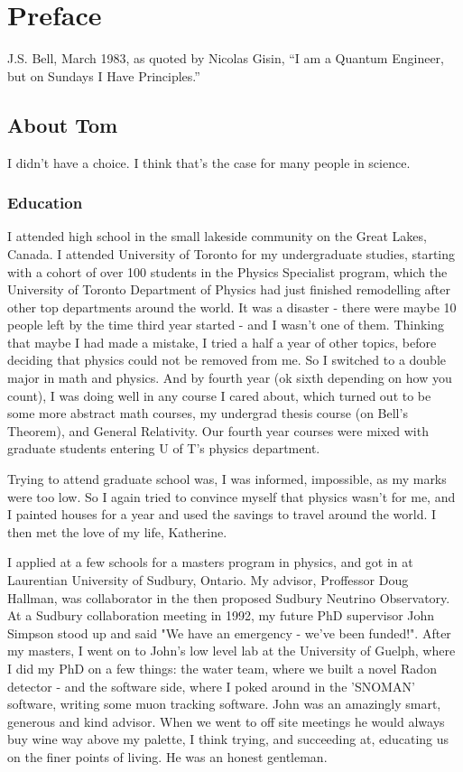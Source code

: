 \documentclass[../rzero]{subfiles}
\begin{document}
\chapter{Preface}

\begin{chapquote}{J.S. Bell, March 1983, as quoted by Nicolas Gisin, \textit{\cite{bertlmannQuantumUnspeakablesBell2002}}}
``I am a Quantum Engineer, but on Sundays I Have Principles.''
\end{chapquote}

\section*{About Tom}
I didn't have a choice. I think that's the case for many people in science. 

\subsection*{Education}
I attended high school in the small lakeside community on the Great Lakes, Canada. I attended University of Toronto for my undergraduate studies, starting with a cohort of over 100 students in the Physics Specialist program, which the University of Toronto Department of Physics had just finished remodelling after other top departments around the world. It was a disaster - there were maybe 10 people left by the time third year started - and I wasn't one of them. Thinking that maybe I had made a mistake, I tried a half a year of other topics, before deciding that physics could not be removed from me. So I switched to a double major in math and physics. And by fourth year (ok sixth depending on how you count), I was doing well in any course I cared about, which turned out to be some more abstract math courses, my undergrad thesis course (on Bell's Theorem), and General Relativity. Our fourth year courses were mixed with graduate students entering U of T's physics department. 

Trying to attend graduate school was, I was informed, impossible, as my marks were too low. So I again tried to convince myself that physics wasn't for me, and I painted houses for a year and used the savings to travel around the world. I then met the love of my life, Katherine. 

I applied at a few schools for a masters program in physics, and got in at Laurentian University of Sudbury, Ontario. My advisor, Proffessor Doug Hallman, was collaborator in the then proposed Sudbury Neutrino Observatory. At a Sudbury collaboration meeting in 1992, my future PhD supervisor John Simpson stood up and said "We have an emergency - we've been funded!". After my masters, I went on to John's low level lab at the University of Guelph, where I did my PhD on a few things: the  water team, where we built a novel Radon detector - and the software side, where I poked around in the 'SNOMAN' software, writing some muon tracking software. John was an amazingly smart, generous and kind advisor. When we went to off site meetings he would always buy wine way above my palette, I think trying, and succeeding at, educating us on the finer points of living. He was an honest gentleman. 
\end{document}
